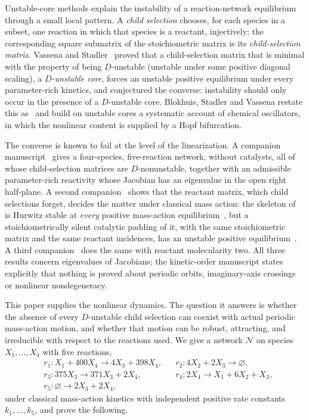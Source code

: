 \documentclass[11pt,a4paper]{article}
\theoremstyle{plain}
\theoremstyle{definition}
\theoremstyle{remark}
\newcommand{\Osc}{\mathcal{N}}
\begin{document}
Unstable-core methods explain the instability of a reaction-network equilibrium through a small local pattern. A \emph{child selection} chooses, for each species in a subset, one reaction in which that species is a reactant, injectively; the corresponding square submatrix of the stoichiometric matrix is its \emph{child-selection matrix}. Vassena and Stadler~\cite{VassenaStadler2024} proved that a child-selection matrix that is minimal with the property of being $D$-unstable (unstable under some positive diagonal scaling), a \emph{$D$-unstable core}, forces an unstable positive equilibrium under every parameter-rich kinetics, and conjectured the converse: instability should only occur in the presence of a $D$-unstable core. Blokhuis, Stadler and Vassena restate this as~\cite[Definition~S3.10 and Conjecture~S3.11]{BSV2025} and build on unstable cores a systematic account of chemical oscillators, in which the nonlinear content is supplied by a Hopf bifurcation.

The converse is known to fail at the level of the linearization. A companion manuscript~\cite{ParameterRich2026} gives a four-species, five-reaction network, without catalysts, all of whose child-selection matrices are $D$-nonunstable, together with an admissible parameter-rich reactivity whose Jacobian has an eigenvalue in the open right half-plane. A second companion~\cite{KineticOrder2026} shows that the reactant matrix, which child selections forget, decides the matter under classical mass action: the skeleton of~\cite{ParameterRich2026} is Hurwitz stable at \emph{every} positive mass-action equilibrium~\cite[Theorem~5.2]{KineticOrder2026}, but a stoichiometrically silent catalytic padding of it, with the same stoichiometric matrix and the same reactant incidences, has an unstable positive equilibrium~\cite[Theorems~6.3 and~7.1]{KineticOrder2026}. A third companion~\cite{ReactantBimolecular2026} does the same with reactant molecularity two. All three results concern eigenvalues of Jacobians; the kinetic-order manuscript states explicitly that nothing is proved about periodic orbits, imaginary-axis crossings or nonlinear nondegeneracy.

This paper supplies the nonlinear dynamics. The question it answers is whether the absence of every $D$-unstable child selection can coexist with actual periodic mass-action motion, and whether that motion can be robust, attracting, and irreducible with respect to the reactions used. We give a network $\Osc$ on species $X_1,\dots,X_4$ with five reactions,
\begin{equation}\label{eq:reactions}
\begin{aligned}
&r_1\colon X_1+400X_4\longrightarrow4X_3+398X_4, &&r_2\colon 4X_2+2X_3\longrightarrow\varnothing,\\
&r_3\colon 375X_3\longrightarrow371X_3+2X_4, &&r_4\colon 2X_4\longrightarrow X_1+6X_2+X_3,\\
&r_5\colon \varnothing\longrightarrow2X_3+2X_4,
\end{aligned}
\end{equation}
under classical mass-action kinetics with independent positive rate constants $k_1,\dots,k_5$, and prove the following.
\end{document}
